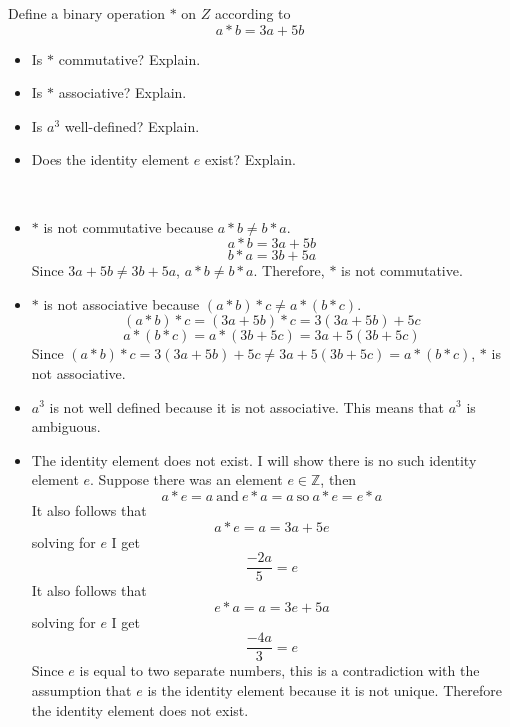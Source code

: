 \documentclass[titlepage]{article}
\newenvironment{problem}[2][Problem]{\begin{trivlist}
\item[\hskip \labelsep {\bfseries #1}\hskip \labelsep {\bfseries #2.}]}{\end{trivlist}}
\begin{document}
\begin{problem}{7}
	Define a binary operation $*$ on $Z$ according to
	$$a*b=3a+5b$$
	\begin{itemize}
		\item[(a)] Is $*$ commutative? Explain.
		\item[(b)] Is $*$ associative? Explain.
		\item[(c)] Is $a^3$ well-defined? Explain.
		\item[(d)] Does the identity element $e$ exist? Explain.
	\end{itemize}
	\ \\
	\begin{itemize}
	\item[(a)] $*$ is not commutative because $a*b \neq b*a$.
	$$a*b = 3a+5b$$
	$$b*a = 3b + 5a$$
	Since $3a+5b \neq 3b+5a$, $a*b \neq b*a$. Therefore, $*$ is not commutative.
	\item[(b)] $*$ is not associative because $(a*b)*c \neq a*(b*c)$. 
	$$(a*b)*c = (3a+5b)*c = 3(3a+5b) + 5c$$
	$$a*(b*c) = a*(3b+5c) = 3a + 5(3b+5c)$$
	Since $(a*b)*c = 3(3a+5b) + 5c \neq 3a + 5(3b+5c)=a*(b*c)$, $*$ is not associative.
	\item[(c)] $a^3$ is not well defined because it is not associative. This means that $a^3$ is ambiguous.
	\item[(d)] The identity element does not exist. I will show there is no such identity element $e$. Suppose there was an element $e \in \mathbb{Z}$, then
		$$a*e = a \ \text{and} \ e*a = a \ \text{so} \ a*e = e*a $$
		It also follows that
		$$a*e = a = 3a + 5e$$
		solving for $e$ I get
		$$ \frac{-2a}{5} = e $$
		It also follows that 
		$$e*a = a = 3e+5a$$
		solving for $e$ I get
		$$\frac{-4a}{3} = e$$
		Since $e$ is equal to two separate numbers, this is a contradiction with the assumption that $e$ is the identity element because it is not unique. Therefore the identity element does not exist.
\end{itemize}
\end{problem}
\end{document}
